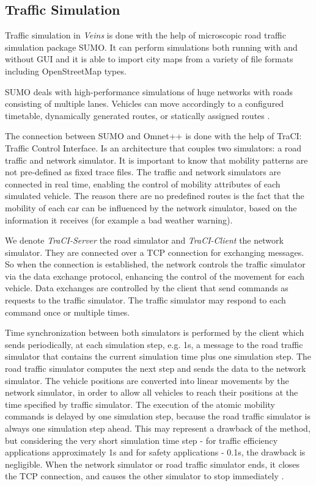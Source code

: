 \subsection{Traffic Simulation}

Traffic simulation in {\it Veins} is done with the help of microscopic road
traffic simulation package SUMO. It can perform simulations both running with
and without GUI and it is able to import city maps from a variety of file
formats including OpenStreetMap types.

SUMO deals with high-performance simulations of huge networks with roads
consisting of multiple lanes. Vehicles can move accordingly to a configured
timetable, dynamically generated routes, or statically assigned routes
\cite{veins}.

The connection between SUMO and Omnet++ is done with the help of TraCI: Traffic
Control Interface. Is an architecture that couples two simulators: a road
traffic and network simulator. It is important to know that mobility patterns
are not pre-defined as fixed trace files. The traffic and network simulators are
connected in real time, enabling the control of mobility attributes of each
simulated vehicle. The reason there are no predefined routes is the fact that
the mobility of each car can be influenced by the network simulator, based on
the information it receives (for example a bad weather warning).

We denote {\it TraCI-Server} the road simulator and {\it TraCI-Client} the
network simulator. They are connected over a TCP connection for exchanging
messages. So when the connection is established, the network controls the
traffic simulator via the data exchange protocol, enhancing the control of the
movement for each vehicle. Data exchanges are controlled by the client that
send commands as requests to the traffic simulator. The traffic simulator
may respond to each command once or multiple times.

Time synchronization between both simulators is performed by the client which
sends periodically, at each simulation step, e.g. 1s, a message to the road
traffic simulator that contains the current simulation time plus one simulation
step. The road traffic simulator computes the next step and sends the data to
the network simulator. The vehicle positions are converted into linear movements
by the network simulator, in order to allow all vehicles to reach their
positions at the time specified by traffic simulator. The execution of the
atomic mobility commands is delayed by one simulation step, because the road
traffic simulator is always one simulation step ahead. This may represent a
drawback of the method, but considering the very short simulation time step -
for traffic efficiency applications approximately 1s and for safety
applications - 0.1s, the drawback is negligible. When the network simulator or
road traffic simulator ends, it closes the TCP connection, and causes the other
simulator to stop immediately \cite{traci_interface}.

